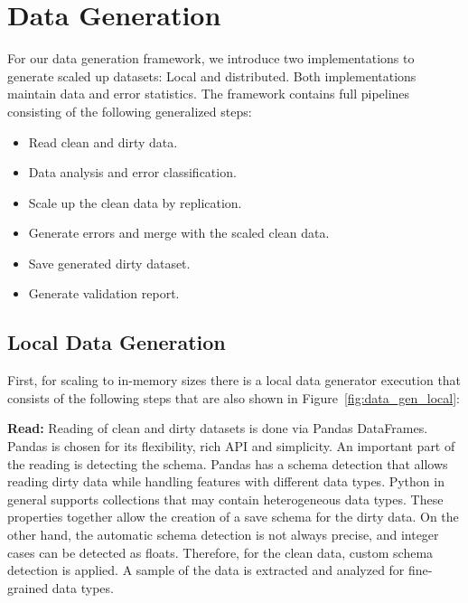 \section{Data Generation}
\label{sec:data_gen}
For our data generation framework, we introduce two implementations to generate scaled up datasets: Local and distributed.
Both implementations maintain data and error statistics. 
The framework contains full pipelines consisting of the following generalized steps:

\begin{itemize}
    \item Read clean and dirty data.
    \item Data analysis and error classification.
    \item Scale up the clean data by replication.
    \item Generate errors and merge with the scaled clean data.
    \item Save generated dirty dataset.
    \item Generate validation report.
\end{itemize}

\subsection{Local Data Generation}
\label{sec:local_generator}


First, for scaling to in-memory sizes there is a local data generator execution that consists of the following steps that are also shown in Figure~\ref{fig:data_gen_local}:

\textbf{Read:} 
Reading of clean and dirty datasets is done via Pandas DataFrames. 
Pandas is chosen for its flexibility, rich API and simplicity. 
An important part of the reading is detecting the schema.
Pandas has a schema detection that allows reading dirty data while handling features with different data types. 
Python in general supports collections that may contain heterogeneous data types. 
These properties together allow the creation of a save schema for the dirty data.
On the other hand, the automatic schema detection is not always precise, and integer cases can be detected as floats. 
Therefore, for the clean data, custom schema detection is applied. 
A sample of the data is extracted and analyzed for fine-grained data types. 

